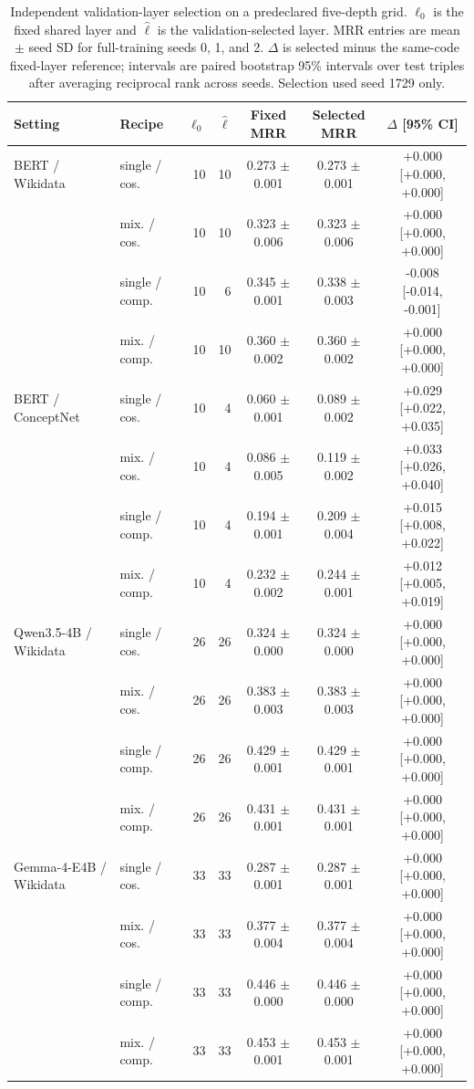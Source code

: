 \begin{table}[t]
\centering
\small
\caption{Independent validation-layer selection on a predeclared five-depth grid. $\ell_0$ is the fixed shared layer and $\hat\ell$ is the validation-selected layer. MRR entries are mean $\pm$ seed SD for full-training seeds 0, 1, and 2. $\Delta$ is selected minus the same-code fixed-layer reference; intervals are paired bootstrap 95\% intervals over test triples after averaging reciprocal rank across seeds. Selection used seed 1729 only.}
\label{tab:independent-layer-selection}
\setlength{\tabcolsep}{2.8pt}
\begin{tabular}{llrrccc}
\toprule
Setting & Recipe & $\ell_0$ & $\hat\ell$ & Fixed MRR & Selected MRR & $\Delta$ [95\% CI] \\
\midrule
BERT / Wikidata & single / cos. & 10 & 10 & 0.273 $\pm$ 0.001 & 0.273 $\pm$ 0.001 & +0.000 [+0.000, +0.000] \\
 & mix. / cos. & 10 & 10 & 0.323 $\pm$ 0.006 & 0.323 $\pm$ 0.006 & +0.000 [+0.000, +0.000] \\
 & single / comp. & 10 & 6 & 0.345 $\pm$ 0.001 & 0.338 $\pm$ 0.003 & -0.008 [-0.014, -0.001] \\
 & mix. / comp. & 10 & 10 & 0.360 $\pm$ 0.002 & 0.360 $\pm$ 0.002 & +0.000 [+0.000, +0.000] \\
\addlinespace[2pt]
BERT / ConceptNet & single / cos. & 10 & 4 & 0.060 $\pm$ 0.001 & 0.089 $\pm$ 0.002 & +0.029 [+0.022, +0.035] \\
 & mix. / cos. & 10 & 4 & 0.086 $\pm$ 0.005 & 0.119 $\pm$ 0.002 & +0.033 [+0.026, +0.040] \\
 & single / comp. & 10 & 4 & 0.194 $\pm$ 0.001 & 0.209 $\pm$ 0.004 & +0.015 [+0.008, +0.022] \\
 & mix. / comp. & 10 & 4 & 0.232 $\pm$ 0.002 & 0.244 $\pm$ 0.001 & +0.012 [+0.005, +0.019] \\
\addlinespace[2pt]
Qwen3.5-4B / Wikidata & single / cos. & 26 & 26 & 0.324 $\pm$ 0.000 & 0.324 $\pm$ 0.000 & +0.000 [+0.000, +0.000] \\
 & mix. / cos. & 26 & 26 & 0.383 $\pm$ 0.003 & 0.383 $\pm$ 0.003 & +0.000 [+0.000, +0.000] \\
 & single / comp. & 26 & 26 & 0.429 $\pm$ 0.001 & 0.429 $\pm$ 0.001 & +0.000 [+0.000, +0.000] \\
 & mix. / comp. & 26 & 26 & 0.431 $\pm$ 0.001 & 0.431 $\pm$ 0.001 & +0.000 [+0.000, +0.000] \\
\addlinespace[2pt]
Gemma-4-E4B / Wikidata & single / cos. & 33 & 33 & 0.287 $\pm$ 0.001 & 0.287 $\pm$ 0.001 & +0.000 [+0.000, +0.000] \\
 & mix. / cos. & 33 & 33 & 0.377 $\pm$ 0.004 & 0.377 $\pm$ 0.004 & +0.000 [+0.000, +0.000] \\
 & single / comp. & 33 & 33 & 0.446 $\pm$ 0.000 & 0.446 $\pm$ 0.000 & +0.000 [+0.000, +0.000] \\
 & mix. / comp. & 33 & 33 & 0.453 $\pm$ 0.001 & 0.453 $\pm$ 0.001 & +0.000 [+0.000, +0.000] \\
\bottomrule
\end{tabular}
\end{table}
